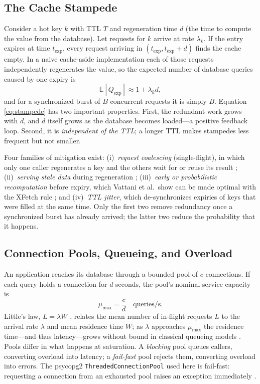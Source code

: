 \documentclass[preprint,12pt]{elsarticle}
\begin{document}
\subsection{The Cache Stampede}
\label{sec:bg-stampede}
Consider a hot key $k$ with TTL $T$ and regeneration time $d$ (the time to compute the
value from the database). Let requests for $k$ arrive at rate $\lambda_k$. If the
entry expires at time $t_{\mathrm{exp}}$, every request arriving in
$(t_{\mathrm{exp}}, t_{\mathrm{exp}}+d)$ finds the cache empty. In a naive cache-aside
implementation each of those requests independently regenerates the value, so the
expected number of database queries caused by one expiry is
\begin{equation}
\mathbb{E}[Q_{\mathrm{exp}}] \approx 1 + \lambda_k d ,
\label{eq:stampede}
\end{equation}
and for a synchronized burst of $B$ concurrent requests it is simply $B$. Equation
\eqref{eq:stampede} has two important properties. First, the redundant work grows
with $d$, and $d$ itself grows as the database becomes loaded---a positive feedback
loop. Second, it is \emph{independent of the TTL}; a longer TTL makes stampedes less
frequent but not smaller.

Four families of mitigation exist:
(i)~\emph{request coalescing} (single-flight), in which only one caller regenerates a
key and the others wait for or reuse its result \cite{nishtala2013,singleflight};
(ii)~\emph{serving stale data} during regeneration \cite{rfc5861,nygard2018};
(iii)~\emph{early or probabilistic recomputation} before expiry, which Vattani et al.\
show can be made optimal with the XFetch rule \cite{vattani2015}; and
(iv)~\emph{TTL jitter}, which de-synchronizes expiries of keys that were filled at the
same time. Only the first two remove redundancy once a synchronized burst has already
arrived; the latter two reduce the probability that it happens.

\subsection{Connection Pools, Queueing, and Overload}
\label{sec:bg-queueing}
An application reaches its database through a bounded pool of $c$ connections. If each
query holds a connection for $d$ seconds, the pool's nominal service capacity is
\begin{equation}
\mu_{\max} = \frac{c}{d}\quad\text{queries/s.}
\label{eq:capacity}
\end{equation}
Little's law, $L=\lambda W$ \cite{little1961}, relates the mean number of in-flight
requests $L$ to the arrival rate $\lambda$ and mean residence time $W$; as $\lambda$
approaches $\mu_{\max}$ the residence time---and thus latency---grows without bound in
classical queueing models \cite{kleinrock1975}. Pools differ in what happens at
saturation. A \emph{blocking} pool queues callers, converting overload into latency;
a \emph{fail-fast} pool rejects them, converting overload into errors. The psycopg2
\texttt{ThreadedConnectionPool} used here is fail-fast: requesting a connection from
an exhausted pool raises an exception immediately \cite{psycopgpool}.
\end{document}
